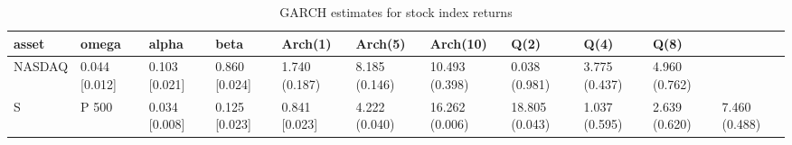 \begin{table}
\caption{GARCH estimates for stock index returns}
\label{tab:garch_estimates}
\begin{tabular}{llllllllll}
\toprule
asset & omega & alpha & beta & Arch(1) & Arch(5) & Arch(10) & Q(2) & Q(4) & Q(8) \\
\midrule
NASDAQ & 0.044 [0.012] & 0.103 [0.021] & 0.860 [0.024] & 1.740 (0.187) & 8.185 (0.146) & 10.493 (0.398) & 0.038 (0.981) & 3.775 (0.437) & 4.960 (0.762) \\
S&P 500 & 0.034 [0.008] & 0.125 [0.023] & 0.841 [0.023] & 4.222 (0.040) & 16.262 (0.006) & 18.805 (0.043) & 1.037 (0.595) & 2.639 (0.620) & 7.460 (0.488) \\
\bottomrule
\end{tabular}
\end{table}
